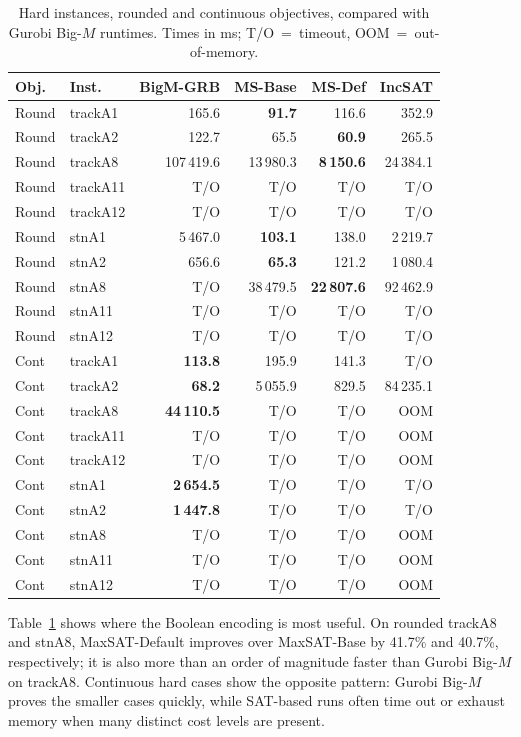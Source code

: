 \documentclass[runningheads]{llncs}
\begin{document}
\begin{table}
\centering
\caption{Hard instances, rounded and continuous objectives, compared with Gurobi Big-$M$ runtimes. Times in ms; T/O~=~timeout, OOM~=~out-of-memory.}
\label{tab:hard-instances}
\scriptsize
\setlength{\tabcolsep}{4.5pt}
\renewcommand{\arraystretch}{1.0}
\begin{tabular}{llrrrr}
\toprule
Obj. & Inst. & BigM-GRB & MS-Base & MS-Def & IncSAT \\
\midrule
Round & trackA1 & 165.6 & \textbf{91.7} & 116.6 & 352.9 \\
Round & trackA2 & 122.7 & 65.5 & \textbf{60.9} & 265.5 \\
Round & trackA8 & 107\,419.6 & 13\,980.3 & \textbf{8\,150.6} & 24\,384.1 \\
Round & trackA11 & T/O & T/O & T/O & T/O \\
Round & trackA12 & T/O & T/O & T/O & T/O \\
Round & stnA1 & 5\,467.0 & \textbf{103.1} & 138.0 & 2\,219.7 \\
Round & stnA2 & 656.6 & \textbf{65.3} & 121.2 & 1\,080.4 \\
Round & stnA8 & T/O & 38\,479.5 & \textbf{22\,807.6} & 92\,462.9 \\
Round & stnA11 & T/O & T/O & T/O & T/O \\
Round & stnA12 & T/O & T/O & T/O & T/O \\
\midrule
Cont & trackA1 & \textbf{113.8} & 195.9 & 141.3 & T/O \\
Cont & trackA2 & \textbf{68.2} & 5\,055.9 & 829.5 & 84\,235.1 \\
Cont & trackA8 & \textbf{44\,110.5} & T/O & T/O & OOM \\
Cont & trackA11 & T/O & T/O & T/O & OOM \\
Cont & trackA12 & T/O & T/O & T/O & OOM \\
Cont & stnA1 & \textbf{2\,654.5} & T/O & T/O & T/O \\
Cont & stnA2 & \textbf{1\,447.8} & T/O & T/O & T/O \\
Cont & stnA8 & T/O & T/O & T/O & OOM \\
Cont & stnA11 & T/O & T/O & T/O & OOM \\
Cont & stnA12 & T/O & T/O & T/O & OOM \\
\bottomrule
\end{tabular}
\end{table}

Table~\ref{tab:hard-instances} shows where the Boolean encoding is most useful.
On rounded trackA8 and stnA8, MaxSAT-Default improves over MaxSAT-Base by
41.7\% and 40.7\%, respectively; it is also more than an order of magnitude
faster than Gurobi Big-$M$ on trackA8. Continuous hard cases show the opposite
pattern: Gurobi Big-$M$ proves the smaller cases quickly, while SAT-based runs
often time out or exhaust memory when many distinct cost levels are present.
\end{document}
